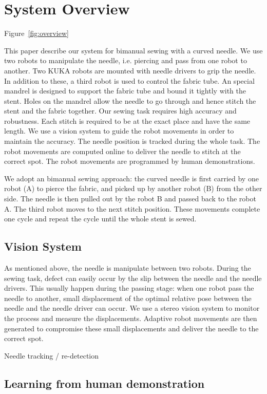 \section{System Overview}
Figure~\ref{fig:overview}

This paper describe our system for bimanual sewing with a curved needle. We use two robots to manipulate the needle, i.e. piercing and pass from one robot to another. Two KUKA robots are mounted with needle drivers to grip the needle. In addition to these, a third robot is used to control the fabric tube. An special mandrel is designed to support the fabric tube and bound it tightly with the stent. Holes on the mandrel allow the needle to go through and hence stitch the stent and the fabric together. Our sewing task requires high accuracy and robustness. Each stitch is required to be at the exact place and have the same length. We use a vision system to guide the robot movements in order to maintain the accuracy. The needle position is tracked during the whole task. The robot movements are computed online to deliver the needle to stitch at the correct spot. The robot movements are programmed by human demonstrations.

We adopt an bimanual sewing approach: the curved needle is first carried by one robot (A) to pierce the fabric, and picked up by another robot (B) from the other side. The needle is then pulled out by the robot B and passed back to the robot A. The third robot moves to the next stitch position. These movements complete one cycle and repeat the cycle until the whole stent is sewed.

\subsection{Vision System}
As mentioned above, the needle is manipulate between two robots. During the sewing task, defect can easily occur by the slip between the needle and the needle drivers. This usually happen during the passing stage: when one robot pass the needle to another, small displacement of the optimal relative pose between the needle and the needle driver can occur. We use a stereo vision system to monitor the process and measure the displacements. Adaptive robot movements are then generated to compromise these small displacements and deliver the needle to the correct spot.

Needle tracking / re-detection

\subsection{Learning from human demonstration}

